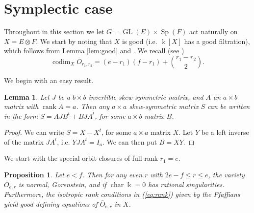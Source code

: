 \documentclass[11pt]{amsart}
\numberwithin{equation}{section}
\newtheorem{proposition}[equation]{Proposition}
\newtheorem{lemma}[equation]{Lemma}
\theoremstyle{definition}
\newtheorem{rmk}[equation]{Remark}
\newenvironment{remark}[1][]{\begin{rmk}[#1] \pushQED{\qed}}{\popQED \end{rmk}}
\DeclareMathOperator{\codim}{codim}
\DeclareMathOperator{\rank}{rank}
\DeclareMathOperator{\GL}{GL}
\DeclareMathOperator{\Sp}{Sp}
\DeclareMathOperator{\cha}{char}
\newcommand{\oo}{\otimes}
\newcommand{\ol}{\overline}
\newcommand{\gfd}{\operatorname{gfd}}
\newcommand{\kk}{\Bbbk}
\newcommand{\blue}[1]{\textcolor{blue}{#1}}
\begin{document}

%

\section{Symplectic case}

Throughout in this section we let $G=\GL(E)\times \Sp(F)$ act naturally on $X=E\oo F$. We start by noting that $X$ is good (i.e. $\kk[X]$ has a good filtration), which follows from Lemma \ref{lem:good} and \cite[Section 4.9]{andjan}. We recall (see \cite[Corollary 2.4]{lovett05})
\begin{equation}\label{eq:codim1}
\codim_X \ol{O}_{r_1,r_2} =  (e-r_1)(f-r_1)+ \binom{r_1-r_2}{2}.
\end{equation}

We begin with an easy result.

\begin{lemma}\label{lem:smooth1}
Let $J$ be a $b\times b$ invertible skew-symmetric matrix, and $A$ an $a\times b$ matrix with $\rank A=a$. Then any $a\times a$ skew-symmetric matrix $S$ can be written in the form $S=A J B^t + B J A^t$, for some $a \times b$ matrix $B$.
\end{lemma}

\begin{proof}
We can write $S=X-X^t$, for some $a \times a$ matrix $X$. Let $Y$ be a left inverse of the matrix $J A^t$, i.e. $Y J A^t= I_a$. We can then put $B=XY$.
\end{proof}


We start with the special orbit closures of full rank $r_1=e$.

\begin{proposition}\label{prop:sympinv}
Let $e < f$. Then for any even $r$ with $2e-f\leq r\leq e$, the variety $\ol{O}_{e, r}$ is normal, Gorenstein, and if $\cha \kk =0$ has rational singularities. Furthermore, the isotropic rank conditions in (\ref{eq:rank}) given by the Pfaffians yield good defining equations of $\ol{O}_{e, r}$ in $X$.
\end{proposition}
\end{document}
